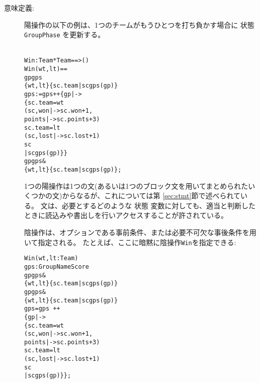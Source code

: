 \documentclass[\pformat,12pt]{jarticle}
\begin{document}
\begin{description}







\item[意味定義:]

陽操作の以下の例は、1つのチームがもうひとつを打ち負かす場合に
状態 \texttt{GroupPhase} 
を更新する。
\begin{alltt}\label{winDef}
  Win : Team * Team ==> ()
  Win (wt,lt) ==
     gp  gps  
         \{wt,lt\}  \{sc.team | sc  gps(gp)\}
     gps := gps ++ \{ gp |-> 
                        \{ sc.team = wt
                         (sc, won |-> sc.won + 1,
                                     points |-> sc.points + 3)
                          sc.team = lt
                         (sc, lost |-> sc.lost + 1)
                          sc 
                    | sc  gps(gp)\}\}
      gp  gps & 
          \{wt,lt\}  \{sc.team | sc  gps(gp)\};
\end{alltt}
1つの陽操作は1つの文(あるいは1つのブロック文を用いてまとめられたいくつかの文)からなるが、これについては第 \ref{sec:stmt}節で述べられている。 
文は、必要とするどのような
状態
変数に対しても、適当と判断したときに読込みや書出しを行いアクセスすることが許されている。

陰操作は、オプションである事前条件、または必要不可欠な事後条件を用いて指定される。
たとえば、ここに暗黙に陰操作\texttt{Win}を指定できる:
\begin{alltt}
  Win (wt,lt: Team)
   gps :  GroupName  Score
    gp  gps & 
          \{wt,lt\}  \{sc.team | sc  gps(gp)\}
    gp  gps &
         \{wt,lt\}  \{sc.team | sc  gps(gp)\}
          gps = gps~ ++ 
                       \{ gp |-> 
                         \{ sc.team = wt
                           (sc, won |-> sc.won + 1,
                                     points |-> sc.points + 3)
                           sc.team = lt
                          (sc, lost |-> sc.lost + 1)
                           sc 
                     | sc  gps(gp)\}\};
\end{alltt}


\end{description}
\end{document}
